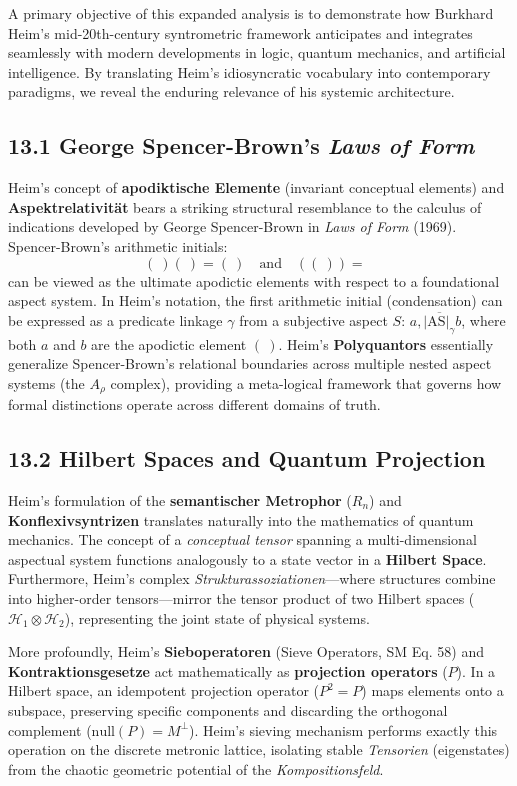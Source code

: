 \documentclass[12pt]{article}
\begin{document}
A primary objective of this expanded analysis is to demonstrate how Burkhard Heim's mid-20th-century syntrometric framework anticipates and integrates seamlessly with modern developments in logic, quantum mechanics, and artificial intelligence. By translating Heim's idiosyncratic vocabulary into contemporary paradigms, we reveal the enduring relevance of his systemic architecture.

\subsection{13.1 George Spencer-Brown’s \textit{Laws of Form}}
Heim's concept of \textbf{apodiktische Elemente} (invariant conceptual elements) and \textbf{Aspektrelativität} bears a striking structural resemblance to the calculus of indications developed by George Spencer-Brown in \textit{Laws of Form} (1969). Spencer-Brown's arithmetic initials:
\begin{equation*}
(\ ) (\ ) = (\ ) \quad \text{and} \quad ((\ )) = \text{ }
\end{equation*}
can be viewed as the ultimate apodictic elements with respect to a foundational aspect system. In Heim's notation, the first arithmetic initial (condensation) can be expressed as a predicate linkage $\gamma$ from a subjective aspect $S$: $a, \overline{|\mathrm{AS}|_\gamma} b$, where both $a$ and $b$ are the apodictic element $(\ )$. Heim's \textbf{Polyquantors} essentially generalize Spencer-Brown's relational boundaries across multiple nested aspect systems (the $A_\rho$ complex), providing a meta-logical framework that governs how formal distinctions operate across different domains of truth.

\subsection{13.2 Hilbert Spaces and Quantum Projection}
Heim's formulation of the \textbf{semantischer Metrophor} ($R_n$) and \textbf{Konflexivsyntrizen} translates naturally into the mathematics of quantum mechanics. The concept of a \textit{conceptual tensor} spanning a multi-dimensional aspectual system functions analogously to a state vector in a \textbf{Hilbert Space}. Furthermore, Heim's complex \textit{Strukturassoziationen}—where structures combine into higher-order tensors—mirror the tensor product of two Hilbert spaces ($\mathcal{H}_1 \otimes \mathcal{H}_2$), representing the joint state of physical systems.

More profoundly, Heim's \textbf{Sieboperatoren} (Sieve Operators, SM Eq. 58) and \textbf{Kontraktionsgesetze} act mathematically as \textbf{projection operators} ($P$). In a Hilbert space, an idempotent projection operator ($P^2 = P$) maps elements onto a subspace, preserving specific components and discarding the orthogonal complement ($\text{null}(P) = M^\perp$). Heim's sieving mechanism performs exactly this operation on the discrete metronic lattice, isolating stable \textit{Tensorien} (eigenstates) from the chaotic geometric potential of the \textit{Kompositionsfeld}.
\end{document}
